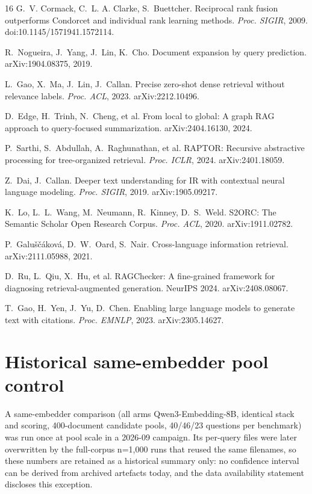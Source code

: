 \documentclass[sigconf,nonacm]{acmart}
\begin{document}
\begin{thebibliography}{16}
 G.~V. Cormack, C.~L. A. Clarke, S.~Buettcher. Reciprocal rank
fusion outperforms Condorcet and individual rank learning methods.
\emph{Proc. SIGIR}, 2009. doi:10.1145/1571941.1572114.

 R.~Nogueira, J.~Yang, J.~Lin, K.~Cho. Document
expansion by query prediction. arXiv:1904.08375, 2019.

 L.~Gao, X.~Ma, J.~Lin, J.~Callan. Precise zero-shot dense
retrieval without relevance labels. \emph{Proc. ACL}, 2023.
arXiv:2212.10496.

 D.~Edge, H.~Trinh, N.~Cheng, et al. From local to
global: A graph RAG approach to query-focused summarization.
arXiv:2404.16130, 2024.

 P.~Sarthi, S.~Abdullah, A.~Raghunathan, et al. RAPTOR:
Recursive abstractive processing for tree-organized retrieval.
\emph{Proc. ICLR}, 2024. arXiv:2401.18059.

 Z.~Dai, J.~Callan. Deeper text understanding for IR with
contextual neural language modeling. \emph{Proc. SIGIR}, 2019.
arXiv:1905.09217.

 K.~Lo, L.~L.~Wang, M.~Neumann, R.~Kinney, D.~S.~Weld.
S2ORC: The Semantic Scholar Open Research Corpus. \emph{Proc. ACL},
2020. arXiv:1911.02782.

 P.~Galu\v{s}\v{c}\'akov\'a, D.~W.~Oard, S.~Nair.
Cross-language information retrieval. arXiv:2111.05988, 2021.

 D.~Ru, L.~Qiu, X.~Hu, et al. RAGChecker: A
fine-grained framework for diagnosing retrieval-augmented generation.
NeurIPS 2024. arXiv:2408.08067.

 T.~Gao, H.~Yen, J.~Yu, D.~Chen. Enabling large language
models to generate text with citations. \emph{Proc. EMNLP}, 2023.
arXiv:2305.14627.

\end{thebibliography}

\appendix

\section{Historical same-embedder pool control}
\label{app:sameemb}

A same-embedder comparison (all arms Qwen3-Embedding-8B, identical
stack and scoring, 400-document candidate pools, 40/46/23 questions per
benchmark) was run once at pool scale in a 2026-09 campaign. Its
per-query files were later overwritten by the full-corpus n=1{,}000
runs that reused the same filenames, so these numbers are retained as a
historical summary only: no confidence interval can be derived from
archived artefacts today, and the data availability statement discloses
this exception.
\end{document}
